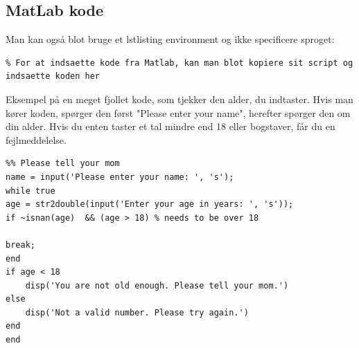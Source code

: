 \subsection{MatLab kode}
Man kan også blot bruge et lstlisting environment og ikke specificere sproget:
\begin{lstlisting}
% For at indsaette kode fra Matlab, kan man blot kopiere sit script og indsaette koden her
\end{lstlisting}
Eksempel på en meget fjollet kode, som tjekker den alder, du indtaster. Hvis man kører koden, spørger den først "Please enter your name", herefter spørger den om din alder. Hvis du enten taster et tal mindre end 18 eller bogstaver, får du en fejlmeddelelse. 
\begin{lstlisting}
%% Please tell your mom
name = input('Please enter your name: ', 's');
while true
age = str2double(input('Enter your age in years: ', 's'));
if ~isnan(age)  && (age > 18) % needs to be over 18
    
break;
end
if age < 18 
    disp('You are not old enough. Please tell your mom.')
else 
    disp('Not a valid number. Please try again.')
end
end

\end{lstlisting}

